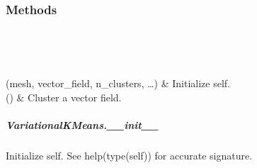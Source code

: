 \documentclass[letterpaper,10pt,english]{sphinxmanual}
\begin{document}
\begin{fulllineitems}
\subsubsection*{Methods}


\begin{savenotes}\sphinxatlongtablestart\begin{longtable}[c]{}
\hline

\endfirsthead

%
{}\\
\hline

\endhead

\hline
{}\\
\endfoot

\endlastfoot

{\hyperref[\detokenize{api/generated/directional_clustering.clustering.VariationalKMeans.__init__:directional_clustering.clustering.VariationalKMeans.__init__}]{}}(mesh, vector\_field, n\_clusters, …)
&
Initialize self.
\\
\hline
{\hyperref[\detokenize{api/generated/directional_clustering.clustering.VariationalKMeans.cluster:directional_clustering.clustering.VariationalKMeans.cluster}]{}}()
&
Cluster a vector field.
\\
\hline
\end{longtable}\sphinxatlongtableend\end{savenotes}


\subparagraph{VariationalKMeans.\_\_init\_\_}
\label{\detokenize{api/generated/directional_clustering.clustering.VariationalKMeans.__init__:variationalkmeans-init}}\label{\detokenize{api/generated/directional_clustering.clustering.VariationalKMeans.__init__::doc}}

\begin{fulllineitems}
\label{\detokenize{api/generated/directional_clustering.clustering.VariationalKMeans.__init__:directional_clustering.clustering.VariationalKMeans.__init__}}
Initialize self.  See help(type(self)) for accurate signature.


\end{fulllineitems}
\end{fulllineitems}
\end{document}

